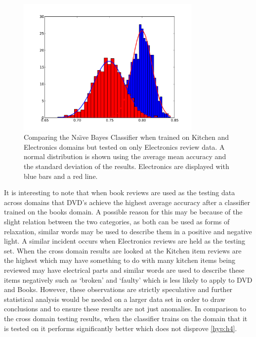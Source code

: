 \documentclass{llncs}
\begin{document}
\begin{figure}[kit_on_elec]
    \centering
    \includegraphics[width=0.8\textwidth]{crossdomain_elec_nb_kitchenONelec.pdf}
    \caption{Comparing the Na\"\i ve Bayes Classifier when trained on Kitchen and Electronics domains but tested on only Electronics review data. A normal distribution is shown using the average mean accuracy and the standard deviation of the results. Electronics are displayed with blue bars and a red line.}
    \label{fig:kitchen_on_elec}
\end{figure}

It is interesting to note that when book reviews are used as the testing data across domains that DVD's achieve the highest average accuracy after a classifier trained on the books domain. A possible reason for this may be because of the slight relation between the two categories, as both can be used as forms of relaxation, similar words may be used to describe them in a positive and negative light. A similar incident occurs when Electronics reviews are held as the testing set. When the cross domain results are looked at the Kitchen item reviews are the highest which may have something to do with many kitchen items being reviewed may have electrical parts and similar words are used to describe these items negatively such as `broken' and `faulty' which is less likely to apply to DVD and Books. However, these observations are strictly speculative and further statistical analysis would be needed on a larger data set in order to draw conclusions and to ensure these results are not just anomalies. In comparison to the cross domain testing results, when the classifier trains on the domain that it is tested on it performs significantly better which does not disprove \ref{hyp:h4}.
\end{document}
